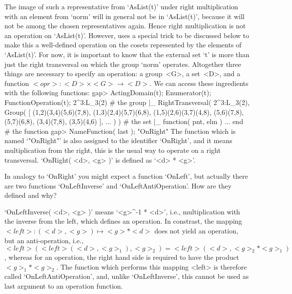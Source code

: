 The  image of  such   a   representative from  `AsList(t)' under    right
multiplication with an  element  from `norm'  will in general  not be  in
`AsList(t)',  because it will   not  be among the  chosen representatives
again.   Hence right multiplication is not   an operation on `AsList(t)'.
However, {\GAP} uses a special trick to be discussed below to make this a
well-defined  operation  on the  cosets   represented by the  elements of
`AsList(t)'. For now, it is important  to know that  the external set `t'
is   more  than just the  right  transversal  on  which  the group `norm'
operates. Altogether three things  are necessary to specify an operation:
a  group~<G>, a  set~<D>, and a   function $<opr>\colon <D>\times  <G>\to
<D>$. We can access these ingredients with the following functions:
\beginexample
    gap> ActingDomain(t); Enumerator(t); FunctionOperation(t);
    2^3:L_3(2)  # the group
|_
    RightTransversal( 2^3:L_3(2), Group( 
    [ (1,2)(3,4)(5,6)(7,8), (1,3)(2,4)(5,7)(6,8), (1,5)(2,6)(3,7)(4,8),
      (5,6)(7,8), (5,7)(6,8), (3,4)(7,8), (3,5)(4,6) ], ... ) )  # the
    set
|_
    function( pnt, elm ) ... end  # the function
    gap> NameFunction( last );
    "OnRight"
\endexample
The function  which   is  named  `"OnRight"'  is  also   assigned to  the
identifier `OnRight', and it means multiplication from the right, this is
the usual way to operate on a right transversal. `OnRight( <d>, <g> )' is
defined as `<d> * <g>'.

\exercise In analogy to `OnRight'  you might expect a function  `OnLeft',
but  actually    there   are    two    functions    `OnLeftInverse'   and
`OnLeftAntiOperation'. How are they defined and why?

\answer   `OnLeftInverse(  <d>,  <g>  )'  means   `<g>^-1 *  <d>',  i.e.,
multiplication  with the  inverse   from   the  left, which defines    an
operation. In constrast,  the mapping $<left>\colon (<d>,<g>) \mapsto <g>
* <d>$ does not yield an operation, but an anti-operation, i.e., $<left>(
<left>( <d>,  <g>_1 ), <g>_2  ) = <left>( <d>, <g>_2  * <g>_1 )$, whereas
for an  operation, the  right hand side  is required  to have the product
$<g>_1 * <g>_2$.  The {\GAP} function which  performs this mapping <left>
is therefore called  `OnLeftAntiOperation', and, unlike  `OnLeftInverse',
this cannot be used as last argument to an operation function.

